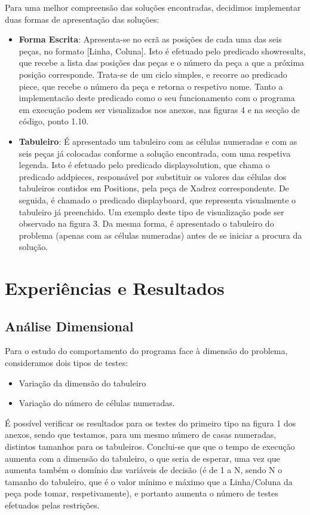 \documentclass[runningheads]{llncs}
\begin{document}
Para uma melhor compreensão das soluções encontradas, decidimos implementar duas formas de apresentação das soluções:
\begin{itemize}
    \item \textbf{Forma Escrita}:
    Apresenta-se no ecrã as posições de cada uma das seis peças, no formato [Linha, Coluna].
    Isto é efetuado pelo predicado show\textunderscore results, que recebe a lista das posições das peças e o número da peça a que a próxima posição corresponde. Trata-se de um ciclo simples, e recorre ao predicado piece, que recebe o número da peça e retorna o respetivo nome.
    Tanto a implementacão deste predicado como o seu funcionamento com o programa em execução podem ser visualizados nos anexos, nas figuras 4 e na secção de código, ponto 1.10.
    \item \textbf{Tabuleiro}:
    É apresentado um tabuleiro com as células numeradas e com as seis peças já colocadas conforme a solução encontrada, com uma respetiva legenda.
    Isto é efetuado pelo predicado display\textunderscore solution, que chama o predicado add\textunderscore pieces, responsável por substituir os valores das células dos tabuleiros contidos em Positions, pela peça de Xadrez correspondente. De seguida, é chamado o predicado display\textunderscore board, que representa visualmente o tabuleiro já preenchido. Um exemplo deste tipo de visualização pode ser observado na figura 3.
    Da mesma forma, é apresentado o tabuleiro do problema (apenas com as células numeradas) antes de se iniciar a procura da solução.
\end{itemize}

\newpage
\section{Experiências e Resultados}
\subsection{Análise Dimensional}
Para o estudo do comportamento do programa face à dimensão do problema, consideramos dois tipos de testes: 
\begin{itemize}
    \item Variação da dimensão do tabuleiro
    \item Variação do número de células numeradas.
\end{itemize}

É possível verificar os resultados para os testes do primeiro tipo na figura 1 dos anexos, sendo que testamos, para um mesmo número de casas numeradas, distintos tamanhos para os tabuleiros.
Conclui-se que  que o tempo de execução aumenta com a dimensão do tabuleiro, o que seria de esperar, uma vez que aumenta também o domínio das variáveis de decisão (é de 1 a N, sendo N o tamanho do tabuleiro, que é o valor mínimo e máximo que a Linha/Coluna da peça pode tomar, respetivamente), e portanto aumenta o número de testes efetuados pelas restrições.
\end{document}
